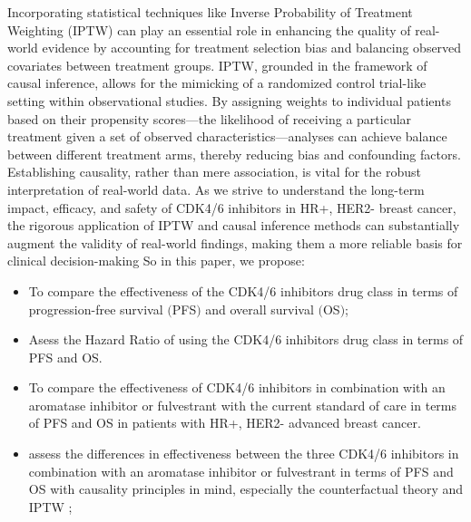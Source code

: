 Incorporating statistical techniques like Inverse Probability of Treatment Weighting (IPTW) can play an essential role in enhancing the quality of real-world evidence by accounting for treatment selection bias and balancing observed covariates between treatment groups. IPTW, grounded in the framework of causal inference, allows for the mimicking of a randomized control trial-like setting within observational studies. By assigning weights to individual patients based on their propensity scores—the likelihood of receiving a particular treatment given a set of observed characteristics—analyses can achieve balance between different treatment arms, thereby reducing bias and confounding factors. Establishing causality, rather than mere association, is vital for the robust interpretation of real-world data. As we strive to understand the long-term impact, efficacy, and safety of CDK4/6 inhibitors in HR+, HER2- breast cancer, the rigorous application of IPTW and causal inference methods can substantially augment the validity of real-world findings, making them a more reliable basis for clinical decision-making \cite{austinIntroductionPropensityScore2011,austinUsePropensityScore2014}
So in this paper, we propose:
\begin{itemize}
    \item To compare the effectiveness of the CDK4/6 inhibitors drug class in terms of progression-free survival $($PFS$)$ and overall survival $($OS$)$;
\item Asess the Hazard Ratio of using the CDK4/6 inhibitors drug class in terms of PFS and OS.
    \item To compare the effectiveness of CDK4/6 inhibitors in combination with an aromatase inhibitor or fulvestrant with the current standard of care in terms of PFS and OS in patients with HR+, HER2- advanced breast cancer.
    \item assess the differences in effectiveness between the three CDK4/6 inhibitors in combination with an aromatase inhibitor or fulvestrant in terms of PFS and OS with causality principles in mind, especially the counterfactual theory and IPTW ;
\end{itemize}
